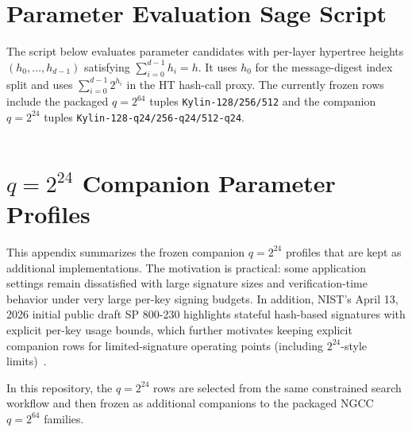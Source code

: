 
\section{Parameter Evaluation Sage Script}
\label{apx:script} 
The script below evaluates parameter candidates with per-layer hypertree heights
$(h_0,\ldots,h_{d-1})$ satisfying $\sum_{i=0}^{d-1} h_i = h$. It uses $h_0$ for
the message-digest index split and uses $\sum_{i=0}^{d-1} 2^{h_i}$ in the HT
hash-call proxy. The currently frozen rows include the packaged
$q=2^{64}$ tuples \texttt{Kylin-128/256/512} and the companion $q=2^{24}$
tuples \texttt{Kylin-128-q24/256-q24/512-q24}.
\inputminted[breaklines,tabsize=4,fontsize=\scriptsize]{python}{paper/code/para.sage}

\section{\texorpdfstring{$q=2^{24}$}{q=2 to the 24} Companion Parameter Profiles}
\label{apx:q24-profiles}

This appendix summarizes the frozen companion $q=2^{24}$ profiles that are
kept as additional implementations. The motivation is practical:
some application settings remain dissatisfied with large signature sizes and
verification-time behavior under very large per-key signing budgets. In
addition, NIST's April 13, 2026 initial public draft SP 800-230 highlights
stateful hash-based signatures with explicit per-key usage bounds, which
further motivates keeping explicit companion rows for limited-signature
operating points (including $2^{24}$-style limits)~\cite{NIST:SP800-230-IPD}.

In this repository, the $q=2^{24}$ rows are selected from the same constrained
search workflow and then frozen as additional companions to the packaged
NGCC $q=2^{64}$ families.

\begin{table}[htbp]
    \centering
    \caption{Frozen companion $q=2^{24}$ Kylin parameter profiles (additional implementations).}
    \label{tab:q24-parameters}
    \scriptsize
\end{table}


